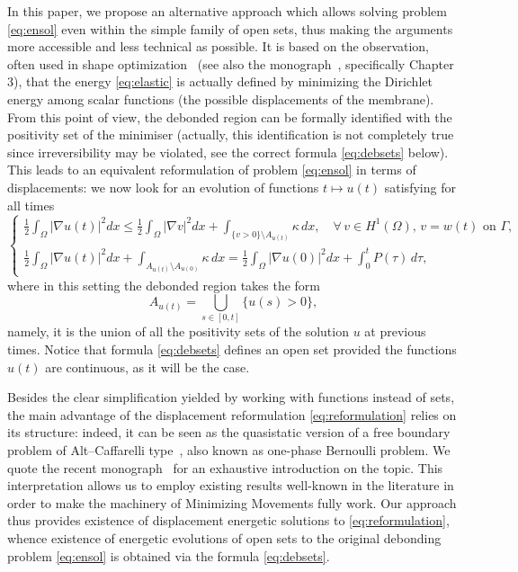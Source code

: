 \documentclass[a4paper,11pt,reqno]{amsart}
\numberwithin{equation}{section}
\theoremstyle{definition}
\theoremstyle{remark}
\begin{document}
In this paper, we propose an alternative approach which allows solving problem \eqref{eq:ensol} even within the simple family of open sets, thus making the arguments more accessible and less technical as possible.
It is based on the observation, often used in shape optimization~\cite{BrianconLamboley, Bucur} (see also the monograph~\cite{Henrot}, specifically Chapter 3), that the energy \eqref{eq:elastic} is actually defined by minimizing the Dirichlet energy among scalar functions (the possible displacements of the membrane). From this point of view, the debonded region can be formally identified with the positivity set of the minimiser (actually, this identification is not completely true since irreversibility may be violated, see the correct formula \eqref{eq:debsets} below). This leads to an equivalent reformulation of problem \eqref{eq:ensol} in terms of displacements: we now look for an evolution of functions $t\mapsto u(t)$ satisfying for all times
\begin{equation}\label{eq:reformulation}
 \begin{cases}
    \displaystyle\frac 12 \int_\Omega |\nabla u(t)|^2 dx\le \frac 12 \int_\Omega |\nabla v|^2 dx+\int_{\{v>0\}\setminus A_{u(t)}}\kappa\, dx,\quad \forall \,v\in H^1(\Omega),\,v=w(t) \text{ on }\Gamma,\\
    \displaystyle\frac 12 \int_\Omega |\nabla u(t)|^2 dx+\int_{A_{u(t)}\setminus A_{u(0)}}\kappa\,d x=   \frac 12 \int_\Omega |\nabla u(0)|^2 dx+\int_0^t P(\tau)\,d\tau,
\end{cases}
\end{equation}
where in this setting the debonded region takes the form
\begin{equation}\label{eq:debsets}
        A_{u(t)}=\bigcup\limits_{s\in [0,t]}\{u(s)>0\},
    \end{equation}
namely, it is the union of all the positivity sets of the solution $u$ at previous times. Notice that formula \eqref{eq:debsets} defines an open set provided the functions $u(t)$ are continuous, as it will be the case.

Besides the clear simplification yielded by working with functions instead of sets, the main advantage of the displacement reformulation \eqref{eq:reformulation} relies on its structure: indeed, it can be seen as the quasistatic version of a free boundary problem of Alt--Caffarelli type~\cite{ALT1981}, also known as one-phase Bernoulli problem. We quote the recent monograph~\cite{Velichkov} for an exhaustive introduction on the topic. This interpretation allows us to employ existing results well-known in the literature in order to make the machinery of Minimizing Movements fully work. Our approach thus provides existence of displacement energetic solutions to \eqref{eq:reformulation}, whence existence of energetic evolutions of open sets to the original debonding problem \eqref{eq:ensol} is obtained via the formula \eqref{eq:debsets}.
\end{document}
